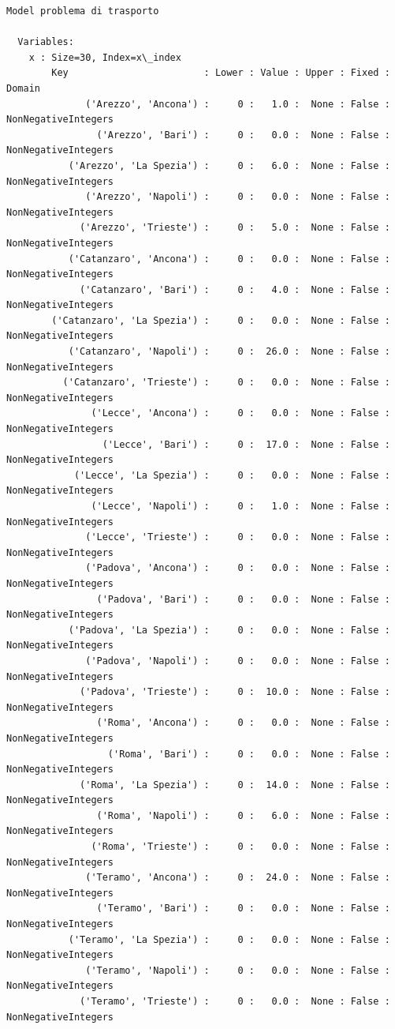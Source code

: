 \documentclass[11pt]{article}
\begin{document}
    \begin{Verbatim}[commandchars=\\\{\}]
Model problema di trasporto

  Variables:
    x : Size=30, Index=x\_index
        Key                        : Lower : Value : Upper : Fixed : Domain
              ('Arezzo', 'Ancona') :     0 :   1.0 :  None : False : NonNegativeIntegers
                ('Arezzo', 'Bari') :     0 :   0.0 :  None : False : NonNegativeIntegers
           ('Arezzo', 'La Spezia') :     0 :   6.0 :  None : False : NonNegativeIntegers
              ('Arezzo', 'Napoli') :     0 :   0.0 :  None : False : NonNegativeIntegers
             ('Arezzo', 'Trieste') :     0 :   5.0 :  None : False : NonNegativeIntegers
           ('Catanzaro', 'Ancona') :     0 :   0.0 :  None : False : NonNegativeIntegers
             ('Catanzaro', 'Bari') :     0 :   4.0 :  None : False : NonNegativeIntegers
        ('Catanzaro', 'La Spezia') :     0 :   0.0 :  None : False : NonNegativeIntegers
           ('Catanzaro', 'Napoli') :     0 :  26.0 :  None : False : NonNegativeIntegers
          ('Catanzaro', 'Trieste') :     0 :   0.0 :  None : False : NonNegativeIntegers
               ('Lecce', 'Ancona') :     0 :   0.0 :  None : False : NonNegativeIntegers
                 ('Lecce', 'Bari') :     0 :  17.0 :  None : False : NonNegativeIntegers
            ('Lecce', 'La Spezia') :     0 :   0.0 :  None : False : NonNegativeIntegers
               ('Lecce', 'Napoli') :     0 :   1.0 :  None : False : NonNegativeIntegers
              ('Lecce', 'Trieste') :     0 :   0.0 :  None : False : NonNegativeIntegers
              ('Padova', 'Ancona') :     0 :   0.0 :  None : False : NonNegativeIntegers
                ('Padova', 'Bari') :     0 :   0.0 :  None : False : NonNegativeIntegers
           ('Padova', 'La Spezia') :     0 :   0.0 :  None : False : NonNegativeIntegers
              ('Padova', 'Napoli') :     0 :   0.0 :  None : False : NonNegativeIntegers
             ('Padova', 'Trieste') :     0 :  10.0 :  None : False : NonNegativeIntegers
                ('Roma', 'Ancona') :     0 :   0.0 :  None : False : NonNegativeIntegers
                  ('Roma', 'Bari') :     0 :   0.0 :  None : False : NonNegativeIntegers
             ('Roma', 'La Spezia') :     0 :  14.0 :  None : False : NonNegativeIntegers
                ('Roma', 'Napoli') :     0 :   6.0 :  None : False : NonNegativeIntegers
               ('Roma', 'Trieste') :     0 :   0.0 :  None : False : NonNegativeIntegers
              ('Teramo', 'Ancona') :     0 :  24.0 :  None : False : NonNegativeIntegers
                ('Teramo', 'Bari') :     0 :   0.0 :  None : False : NonNegativeIntegers
           ('Teramo', 'La Spezia') :     0 :   0.0 :  None : False : NonNegativeIntegers
              ('Teramo', 'Napoli') :     0 :   0.0 :  None : False : NonNegativeIntegers
             ('Teramo', 'Trieste') :     0 :   0.0 :  None : False : NonNegativeIntegers
    

\end{Verbatim}
\end{document}
